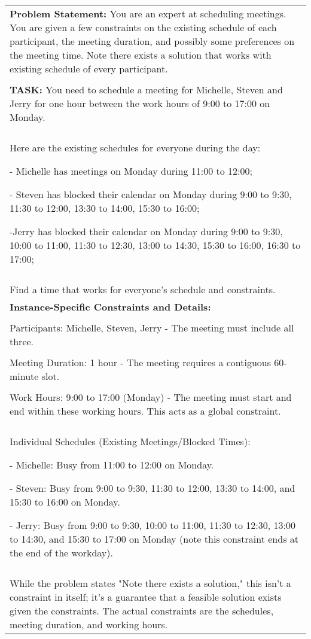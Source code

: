 \begin{table*}
\centering
\scriptsize
\begin{tabular}{p{\linewidth}}
\toprule
\textbf{Problem Statement:} You are an expert at scheduling meetings. You are given a few constraints on the existing schedule of each participant, the meeting duration, and possibly some preferences on the meeting time. Note there exists a solution that works with existing schedule of every participant.
\\\\
\textbf{TASK:} You need to schedule a meeting for Michelle, Steven and Jerry for one hour between the work hours of 9:00 to 17:00 on Monday.
\\\\
Here are the existing schedules for everyone during the day:

- Michelle has meetings on Monday during 11:00 to 12:00;

- Steven has blocked their calendar on Monday during 9:00 to 9:30, 11:30 to 12:00, 13:30 to 14:00, 15:30 to 16:00;

 -Jerry has blocked their calendar on Monday during 9:00 to 9:30, 10:00 to 11:00, 11:30 to 12:30, 13:00 to 14:30, 15:30 to 16:00, 16:30 to 17:00;
\\\\
Find a time that works for everyone's schedule and constraints.
\\ \midrule
\textbf{Instance-Specific Constraints and Details:}
\\\\
Participants: Michelle, Steven, Jerry - The meeting must include all three.
\\\\
Meeting Duration: 1 hour - The meeting requires a contiguous 60-minute slot.
\\\\
Work Hours: 9:00 to 17:00 (Monday) -  The meeting must start and end within these working hours.  This acts as a global constraint.
\\\\
Individual Schedules (Existing Meetings/Blocked Times):

    - Michelle: Busy from 11:00 to 12:00 on Monday.
    
    - Steven: Busy from 9:00 to 9:30, 11:30 to 12:00, 13:30 to 14:00, and 15:30 to 16:00 on Monday.
    
    - Jerry: Busy from 9:00 to 9:30, 10:00 to 11:00, 11:30 to 12:30, 13:00 to 14:30, and 15:30 to 17:00 on Monday (note this constraint ends at the end of the workday).
\\\\
While the problem states "Note there exists a solution," this isn't a constraint in itself; it's a guarantee that a feasible solution exists given the constraints. The actual constraints are the schedules, meeting duration, and working hours.
\\ \midrule


\end{tabular}
\end{table*}
